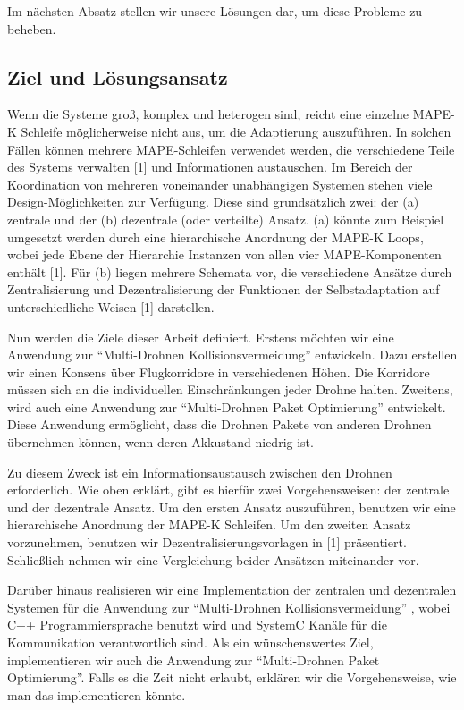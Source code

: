 \documentclass[a4paper,titlepage,onecolumn,twoside,12pt]{article}
\begin{document}
Im nächsten Absatz stellen wir unsere Lösungen dar, um diese Probleme zu beheben.
\subsection{Ziel und Lösungsansatz}
\label{subsec:ziel}
Wenn die Systeme groß, komplex und heterogen sind, reicht eine einzelne MAPE-K Schleife möglicherweise nicht aus, um die Adaptierung auszuführen. In 
solchen Fällen können mehrere MAPE-Schleifen verwendet werden, die verschiedene Teile des Systems verwalten [1] und Informationen austauschen. Im Bereich 
der Koordination von mehreren voneinander unabhängigen Systemen stehen viele Design-Möglichkeiten zur Verfügung. Diese sind grundsätzlich zwei: der (a) 
zentrale und der (b) dezentrale (oder verteilte) Ansatz. (a) könnte zum Beispiel umgesetzt werden durch eine hierarchische Anordnung der MAPE-K Loops, 
wobei jede Ebene der Hierarchie Instanzen von allen vier MAPE-Komponenten enthält [1]. Für (b) liegen mehrere Schemata vor, die verschiedene Ansätze durch 
Zentralisierung und Dezentralisierung der Funktionen der Selbstadaptation auf unterschiedliche Weisen [1] darstellen. 



Nun werden die Ziele dieser Arbeit definiert. Erstens möchten wir eine Anwendung zur “Multi-Drohnen Kollisionsvermeidung” entwickeln. Dazu erstellen wir 
einen Konsens über Flugkorridore in verschiedenen Höhen. Die Korridore müssen sich an die individuellen Einschränkungen jeder Drohne halten. Zweitens, wird 
auch eine Anwendung zur “Multi-Drohnen Paket Optimierung” entwickelt. Diese Anwendung ermöglicht, dass die Drohnen Pakete von anderen Drohnen übernehmen 
können, wenn deren Akkustand niedrig ist.

 
Zu diesem Zweck  ist ein Informationsaustausch zwischen den Drohnen erforderlich. Wie oben erklärt, gibt es hierfür zwei Vorgehensweisen: der zentrale und 
der dezentrale Ansatz. Um den ersten Ansatz auszuführen, benutzen wir eine hierarchische Anordnung der MAPE-K Schleifen. Um den zweiten Ansatz vorzunehmen, 
benutzen wir Dezentralisierungsvorlagen in [1] präsentiert. Schließlich nehmen wir eine Vergleichung beider Ansätzen miteinander vor.

 
Darüber hinaus realisieren wir eine Implementation der zentralen und dezentralen Systemen für die Anwendung zur “Multi-Drohnen Kollisionsvermeidung” , 
wobei C++ Programmiersprache benutzt wird und SystemC Kanäle für die Kommunikation verantwortlich sind. Als ein wünschenswertes Ziel, implementieren wir 
auch die Anwendung zur “Multi-Drohnen Paket Optimierung”. Falls es die Zeit nicht erlaubt, erklären wir die Vorgehensweise, wie man das implementieren 
könnte.
\end{document}
